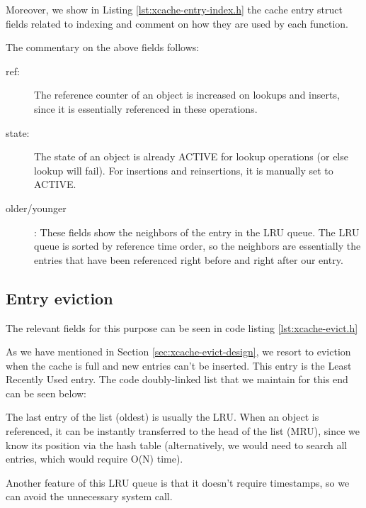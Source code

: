 Moreover, we show in Listing \ref{lst:xcache-entry-index.h} the cache entry 
struct fields related to indexing and comment on how they are used by each 
function.


The commentary on the above fields follows:

\begin{description}
	\item[ref:] The reference counter of an object is increased on lookups 
		and inserts, since it is essentially referenced in these 
		operations.
	\item[state:] The state of an object is already ACTIVE for lookup 
		operations (or else lookup will fail). For insertions and 
		reinsertions, it is manually set to ACTIVE.
	\item[older/younger]: These fields show the neighbors of the entry in 
		the LRU queue. The LRU queue is sorted by reference time order, 
		so the neighbors are essentially the entries that have been 
		referenced right before and right after our entry.
\end{description}

\subsection{Entry eviction}\label{xcache-evict-imp}

The relevant fields for this purpose can be seen in code listing 
\ref{lst:xcache-evict.h}


As we have mentioned in Section \ref{sec:xcache-evict-design}, we resort to 
eviction when the cache is full and new entries can't be inserted. This entry 
is the Least Recently Used entry. The code doubly-linked list that we maintain 
for this end can be seen below:


The last entry of the list (oldest) is usually the LRU. When an object is 
referenced, it can be instantly transferred to the head of the list (MRU), 
since we know its position via the hash table (alternatively, we would need to 
search all entries, which would require O(N) time).

Another feature of this LRU queue is that it doesn't require timestamps, so we 
can avoid the unnecessary system call.

